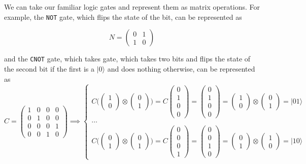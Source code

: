 \documentclass{article}
\theoremstyle{definition}
\begin{document}
We can take our familiar logic gates and represent them as matrix operations. For example, the \texttt{NOT} gate, which flips the state of the bit, can be represented as 

  \[N = \begin{pmatrix} 0 & 1 \\ 1 & 0 \end{pmatrix}\]

and the \texttt{CNOT} gate, which takes gate, which takes two bits and flips the state of the second bit if the first is a $|0\rangle$ and does nothing otherwise, can be represented as 
  \[
    C = \begin{pmatrix} 1&0&0&0\\0&1&0&0\\0&0&0&1\\0&0&1&0 \end{pmatrix} \implies \begin{cases} C \Bigg( \begin{pmatrix} 1 \\ 0 \end{pmatrix} \otimes \begin{pmatrix} 0 \\ 1 \end{pmatrix} \Bigg) = C \begin{pmatrix} 0\\1\\0\\0 \end{pmatrix} = \begin{pmatrix} 0\\1\\0\\0 \end{pmatrix} = \begin{pmatrix} 1 \\ 0 \end{pmatrix} \otimes \begin{pmatrix} 0 \\ 1 \end{pmatrix} = |01\rangle\\
    \ldots \\
    C \Bigg( \begin{pmatrix} 0 \\ 1 \end{pmatrix} \otimes \begin{pmatrix} 0 \\ 1 \end{pmatrix} \Bigg) = C \begin{pmatrix} 0\\0\\0\\1 \end{pmatrix} = \begin{pmatrix} 0\\0\\1\\0 \end{pmatrix} = \begin{pmatrix} 0 \\ 1 \end{pmatrix} \otimes \begin{pmatrix} 1 \\ 0 \end{pmatrix} = |10\rangle 

\end{cases}\]
\end{document}
